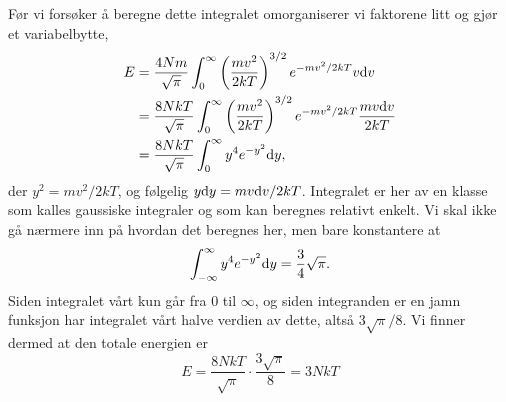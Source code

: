 Før vi forsøker å beregne dette integralet omorganiserer vi faktorene litt og gjør et variabelbytte,
\begin{displaymath}
\begin{aligned}
	E &= \frac{4Nm}{\sqrt{\pi}} \int_0^\infty \left(\frac{mv^2}{2kT}\right)^{3/2} e^{-mv^2/2kT} v\text{d} v \\
	&= \frac{8NkT}{\sqrt{\pi}} \int_0^\infty \left(\frac{mv^2}{2kT}\right)^{3/2} e^{-mv^2/2kT} \frac{mv \text{d} v}{2kT} \\
	& = \frac{8NkT}{\sqrt{\pi}} \int_0^\infty y^4 e^{-y^2} \text{d} y,
\end{aligned}
\end{displaymath}
der $y^2 = mv^2/2kT$, og følgelig $y\text{d} y = mv\text{d} v/2kT$. Integralet er her av en klasse som kalles gaussiske integraler og som kan beregnes relativt enkelt. Vi skal ikke gå nærmere inn på hvordan det beregnes her, men bare konstantere at
\begin{displaymath}
	\int_{-\infty}^\infty y^4e^{-y^2} \text{d} y = \frac{3}{4}\sqrt{\pi}.
\end{displaymath}
Siden integralet vårt kun går fra $0$ til $\infty$, og siden integranden er en jamn funksjon har integralet vårt halve verdien av dette, altså $3\sqrt{\pi}/8$. Vi finner dermed at den totale energien er 
\begin{displaymath}
	E = \frac{8NkT}{\sqrt{\pi}}\cdot \frac{3\sqrt{\pi}}{8} = 3NkT
\end{displaymath}



